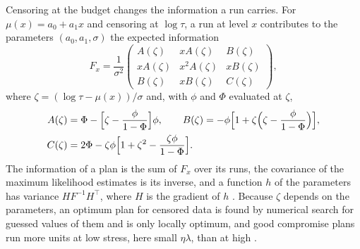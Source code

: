 \documentclass[a4paper,11pt]{article} %
\begin{document}
Censoring at the budget changes the information a run carries. For
$\mu(x)=a_0+a_1x$ and censoring at $\log\tau$, a run at level $x$ contributes
to the parameters $(a_0,a_1,\sigma)$ the expected information
\begin{equation}
  F_x = \frac{1}{\sigma^2}
  \begin{pmatrix}
    A(\zeta)  & xA(\zeta)   & B(\zeta)  \\
    xA(\zeta) & x^2A(\zeta) & xB(\zeta) \\
    B(\zeta)  & xB(\zeta)   & C(\zeta)
  \end{pmatrix},
\end{equation}
where $\zeta=(\log\tau-\mu(x))/\sigma$ and, with $\phi$ and $\Phi$ evaluated
at $\zeta$,
\begin{equation}
  \begin{aligned}
    A(\zeta) &= \Phi-\Bigl[\zeta-\frac{\phi}{1-\Phi}\Bigr]\phi, \qquad
    B(\zeta) = -\phi\Bigl[1+\zeta\Bigl(\zeta-\frac{\phi}{1-\Phi}\Bigr)\Bigr],\\
    C(\zeta) &= 2\Phi-\zeta\phi\Bigl[1+\zeta^2-\frac{\zeta\phi}{1-\Phi}\Bigr].
  \end{aligned}
\end{equation}
The information of a plan is the sum of $F_x$ over its runs, the covariance
of the maximum likelihood estimates is its inverse, and a function $h$ of the
parameters has variance $HF^{-1}H^\top$, where $H$ is the gradient of $h$
\citep{nelsonAcceleratedTestingStatistical1990}. Because $\zeta$ depends on the
parameters, an optimum plan for censored data is found by numerical search
for guessed values of them and is only locally optimum, and good compromise
plans run more units at low stress, here small $\eta\lambda$, than at high
\citep{nelsonAcceleratedTestingStatistical1990}.
\end{document}
